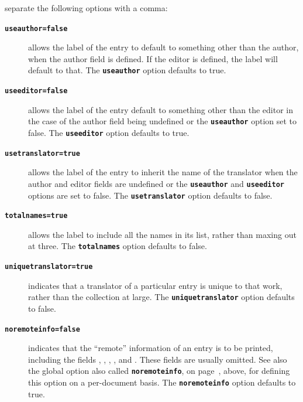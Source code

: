 \documentclass{ltxdockit}[2011/03/25]
\makeatletter
\newcommand*{\mycode}[1]{\texttt{\textbf{#1}}}%
\newenvironment*{optionslist}
  {\list{}{%
     \setlength{\labelwidth}{\marglistwidth}%
     \setlength{\labelsep}{\marglistsep}%
     \setlength{\leftmargin}{0pt}%
     \renewcommand*{\makelabel}[1]{\hss\marglistfont##1}}%
   \def\optionitem##1{%
     \item[{##1}]%
     \ltd@pdfbookmark{##1}{##1}}}
  {\endlist}
\makeatother
\begin{document}
\begin{optionslist}
	\optionitem{options}
	separate the following options with a comma:
	\begin{description}
		\item[\mycode{useauthor=false}] allows the label of the entry to default to something other than the author, when the author field is defined. If the editor is defined, the label will default to that. The \mycode{useauthor} option defaults to true.
		\item[\mycode{useeditor=false}] allows the label of the entry default to something other than the editor in the case of the author field being undefined or the \mycode{useauthor} option set to false. The \mycode{useeditor} option defaults to true.
		\item[\mycode{usetranslator=true}] allows the label of the entry to inherit the name of the translator when the author and editor fields are undefined or the \mycode{useauthor} and \mycode{useeditor} options are set to false. The \mycode{usetranslator} option defaults to false.
		\item[\mycode{totalnames=true}] allows the label to include all the names in its list, rather than maxing out at three. The \mycode{totalnames} option defaults to false.
		\item[\mycode{uniquetranslator=true}] indicates that a translator of a particular  entry is unique to that work, rather than the collection at large. The \mycode{uniquetranslator} option defaults to false.
		\item[\mycode{noremoteinfo=false}] indicates that the ``remote'' information of an entry is to be printed, including the fields , , , , and . These fields are usually omitted. See also the global option also called \mycode{noremoteinfo}, on page~\pageref{mla:internal:noremoteinfo}, above, for defining this option on a per-document basis. The \mycode{noremoteinfo} option defaults to true.
	\end{description}	
\end{optionslist}
\end{document}
